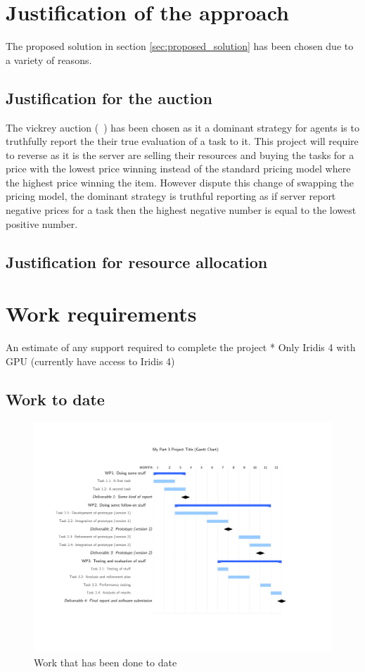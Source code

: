 \documentclass[sotoncolour]{extra/uosproject}     %
\begin{document}
\chapter{Justification of the approach}
The proposed solution in section \ref{sec:proposed_solution} has been chosen due to a variety of reasons. 

\section{Justification for the auction} \label{subsec:just_auction}
The vickrey auction (~\cite{vickrey}) has been chosen as it a dominant strategy for agents is to truthfully report the their true evaluation of a task to it. This project will require to reverse as it is the server are selling their resources and buying the tasks for a price with the lowest price winning instead of the standard pricing model where the highest price winning the item. However dispute this change of swapping the pricing model, the dominant strategy is truthful reporting as if server report negative prices for a task then the highest negative number is equal to the lowest positive number. 

\section{Justification for resource allocation} \label{subsec:just_resource_allocation}


\chapter{Work requirements}
An estimate of any support required to complete the project
* Only Iridis 4 with GPU (currently have access to Iridis 4)

\section{Work to date}
\begin{figure}
    \centering
    \includegraphics{past_work_grantt/past_grantt.pdf}
    \caption{Work that has been done to date}
    \label{fig:past_grantt}
\end{figure}
\end{document}
